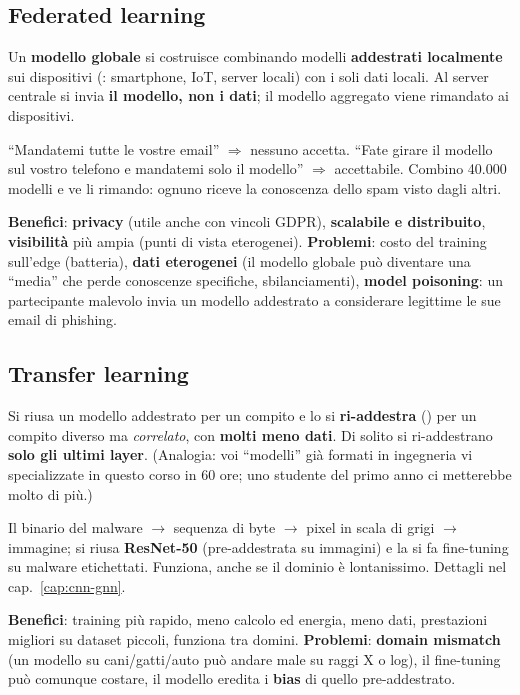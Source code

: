 \subsection{Federated learning}
Un \textbf{modello globale} si costruisce combinando modelli \textbf{addestrati localmente} sui dispositivi
(: smartphone, IoT, server locali) con i soli dati locali. Al server centrale si invia \textbf{il modello,
non i dati}; il modello aggregato viene rimandato ai dispositivi.
\begin{esempio}
``Mandatemi tutte le vostre email'' $\Rightarrow$ nessuno accetta. ``Fate girare il modello sul vostro telefono e
mandatemi solo il modello'' $\Rightarrow$ accettabile. Combino 40.000 modelli e ve li rimando: ognuno riceve la conoscenza
dello spam visto dagli altri.
\end{esempio}
\textbf{Benefici}: \textbf{privacy} (utile anche con vincoli GDPR), \textbf{scalabile e distribuito}, \textbf{visibilità}
più ampia (punti di vista eterogenei). \textbf{Problemi}: costo del training sull'edge (batteria), \textbf{dati eterogenei}
(il modello globale può diventare una ``media'' che perde conoscenze specifiche, sbilanciamenti), \textbf{model poisoning}:
un partecipante malevolo invia un modello addestrato a considerare legittime le sue email di phishing.

\subsection{Transfer learning}
Si riusa un modello addestrato per un compito e lo si \textbf{ri-addestra} () per un compito diverso ma
\emph{correlato}, con \textbf{molti meno dati}. Di solito si ri-addestrano \textbf{solo gli ultimi layer}.
(Analogia: voi ``modelli'' già formati in ingegneria vi specializzate in questo corso in 60 ore; uno studente del primo
anno ci metterebbe molto di più.)
\begin{esempio}
Il binario del malware $\to$ sequenza di byte $\to$ pixel in scala di grigi $\to$ immagine; si riusa
\textbf{ResNet-50} (pre-addestrata su immagini) e la si fa fine-tuning su malware etichettati. Funziona, anche se il
dominio è lontanissimo. Dettagli nel cap.~\ref{cap:cnn-gnn}.
\end{esempio}
\textbf{Benefici}: training più rapido, meno calcolo ed energia, meno dati, prestazioni migliori su dataset piccoli,
funziona tra domini. \textbf{Problemi}: \textbf{domain mismatch} (un modello su cani/gatti/auto può andare male su
raggi X o log), il fine-tuning può comunque costare, il modello eredita i \textbf{bias} di quello pre-addestrato.

